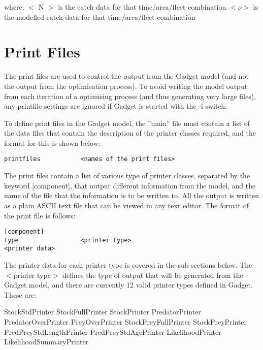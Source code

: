 \documentclass[10pt,twoside]{book}
\begin{document}
where:\newline
$<$ N $>$ is the catch data for that time/area/fleet combination\newline
$<\nu>$ is the modelled catch data for that time/area/fleet combination

\chapter{Print Files}\label{chap:print}
The print files are used to control the output from the Gadget model (and not the output from the optimisation process).  To avoid writing the model output from each iteration of a optimising process (and thus generating very large files), any printfile settings are ignored if Gadget is started with the -l switch.

\bigskip
To define print files in the Gadget model, the ''main'' file must contain a list of the data files that contain the description of the printer classes required, and the format for this is shown below:

{\small\begin{verbatim}
printfiles           <names of the print files>
\end{verbatim}}

The print files contain a list of various type of printer classes, separated by the keyword [component], that output different information from the model, and the name of the file that the information is to be written to.  All the output is written as a plain ASCII text file that can be viewed in any text editor.  The format of the print file is follows:

{\small\begin{verbatim}
[component]
type                 <printer type>
<printer data>
\end{verbatim}}

The printer data for each printer type is covered in the sub sections below.  The $<$printer type$>$ defines the type of output that will be generated from the Gadget model, and there are currently 12 valid printer types defined in Gadget.  These are:

\bigskip
StockStdPrinter\newline
StockFullPrinter\newline
StockPrinter\newline
PredatorPrinter\newline
PredatorOverPrinter\newline
PreyOverPrinter\newline
StockPreyFullPrinter\newline
StockPreyPrinter\newline
PredPreyStdLengthPrinter\newline
PredPreyStdAgePrinter\newline
LikelihoodPrinter\newline
LikelihoodSummaryPrinter
\end{document}
